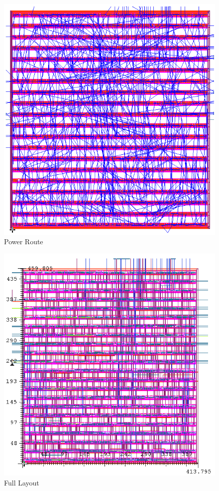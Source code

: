 \documentclass[11pt]{article}
\begin{document}
		\begin{figure}[H] 
			\centering 
			\includegraphics[width=\textwidth,height=\dimexpr\textheight-4\baselineskip-\abovecaptionskip-\belowcaptionskip\relax,keepaspectratio]{"Pictures/Power Route"}
			\caption{Power Route} 
			\label{fig:Power-Route} 
		\end{figure}
		
		\begin{figure}[H] 
			\centering 
			\includegraphics[width=\textwidth,height=\dimexpr\textheight-4\baselineskip-\abovecaptionskip-\belowcaptionskip\relax,keepaspectratio]{"Pictures/Full Layout"}
			\caption{Full Layout} 
			\label{fig:Full-Layout} 
		\end{figure}
	
\end{document}
